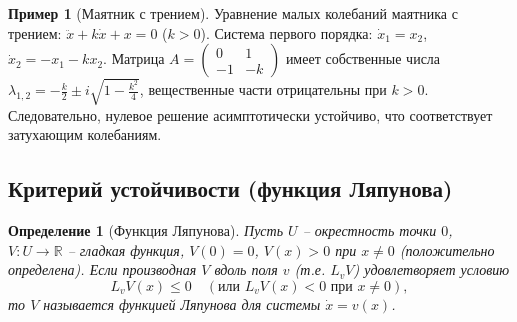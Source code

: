 \documentclass[a4paper,12pt]{article}
\newtheorem{definition}{Определение}
\theoremstyle{definition}
\newtheorem{example}{Пример}
\begin{document}
\begin{example}[Маятник с трением]
	Уравнение малых колебаний маятника с трением: $\ddot{x}+k\dot{x}+x=0$ ($k>0$). Система первого порядка: $\dot{x}_1=x_2$, $\dot{x}_2=-x_1-kx_2$. Матрица $A=\begin{pmatrix}0&1\\-1&-k\end{pmatrix}$ имеет собственные числа $\lambda_{1,2}=-\frac{k}{2}\pm i\sqrt{1-\frac{k^2}{4}}$, вещественные части отрицательны при $k>0$. Следовательно, нулевое решение асимптотически устойчиво, что соответствует затухающим колебаниям.
\end{example}

\subsection{Критерий устойчивости (функция Ляпунова)}

\begin{definition}[Функция Ляпунова]
	Пусть $U$ – окрестность точки $0$, $V:U\to\mathbb{R}$ – гладкая функция, $V(0)=0$, $V(x)>0$ при $x\neq0$ (положительно определена).
	Если производная $V$ вдоль поля $v$ (т.е. $L_v V$) удовлетворяет условию
	\[
	L_v V(x) \le 0 \quad (\text{или } L_v V(x) < 0 \text{ при } x\neq0),
	\]
	то $V$ называется \emph{функцией Ляпунова} для системы $\dot{x}=v(x)$.
\end{definition}
\end{document}
